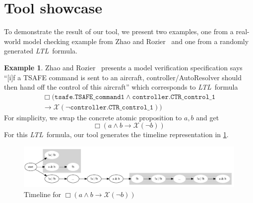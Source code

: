 \documentclass[preprint,12pt]{elsarticle}
\theoremstyle{definition}
\newtheorem{example}{Example}[section]
\theoremstyle{remark}
\newcommand{\always}{\Box}
\newcommand{\nextt}{\mathcal{X}}
\newcommand{\limplies}{\rightarrow}
\newcommand{\ltl}{\textit{LTL}}
\begin{document}
\section{Tool showcase} \label{sec:tool-showcase}
To demonstrate the result of our tool, we present two examples, one from a real-world model checking example from Zhao and Rozier~\cite{ZR14} and one from a randomly generated \ltl\ formula.

\begin{example} \label{example:air}
    Zhao and Rozier~\cite{ZR14} presents a model verification specification says ``[i]f a TSAFE command is sent to an aircraft, controller/AutoResolver should then hand off the control of this aircraft'' which corresponds to \ltl\ formula
    \begin{align*}
        \always (\texttt{tsafe.TSAFE\_command1} \land \texttt{controller.CTR\_control\_1} \\
        \limplies \nextt (\neg \texttt{controller.CTR\_control\_1}))
    \end{align*}
    For simplicity, we swap the concrete atomic proposition to $a,b$ and get
    \[
        \always (a \land b \limplies \nextt (\neg b))
    \]
    For this \ltl\ formula, our tool generates the timeline representation in \cref{fig:ex14}.
    \begin{figure}[h!]
        \centering
        \includegraphics[scale=0.3]{examples/ex14/ex14.png}
        \caption{Timeline for $\always (a \land b \limplies \nextt (\neg b))$}
        \label{fig:ex14}
    \end{figure}
\end{example}
\end{document}
